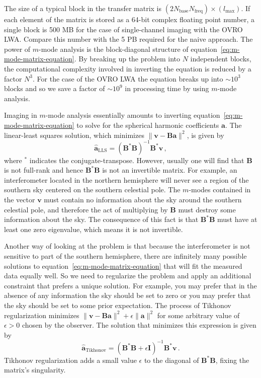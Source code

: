 \documentclass[twocolumn]{aastex6}
\renewcommand{\b}{\pmb}
\begin{document}
The size of a typical block in the transfer matrix is
$(2N_\text{base}N_\text{freq})\times(l_\text{max})$. If each element of the matrix is stored as a
64-bit complex floating point number, a single block is 500 MB for the case of single-channel
imaging with the OVRO LWA. Compare this number with the 5 PB required for the naive approach.  The
power of $m$-mode analysis is the block-diagonal structure of
equation~\ref{eq:m-mode-matrix-equation}.  By breaking up the problem into $N$ independent blocks,
the computational complexity involved in inverting the equation is reduced by a factor $N^3$. For
the case of the OVRO LWA the equation breaks up into $\sim10^3$ blocks and so we save a factor of
$\sim10^9$ in processing time by using $m$-mode analysis.

Imaging in $m$-mode analysis essentially amounts to inverting
equation~\ref{eq:m-mode-matrix-equation} to solve for the spherical harmonic coefficients $\b a$.
The linear-least squares solution, which minimizes $\|\b v - \b B\b a\|^2$, is given by
\begin{equation}
    \b{\hat a}_\text{LLS} = (\b B^*\b B)^{-1}\b B^*\b v\,,
\end{equation}
where $^*$ indicates the conjugate-transpose. However, usually one will find that $\b B$ is not
full-rank and hence $\b B^*\b B$ is not an invertible matrix. For example, an interferometer located
in the northern hemisphere will never see a region of the southern sky centered on the southern
celestial pole. The $m$-modes contained in the vector $\b v$ must contain no information
about the sky around the southern celestial pole, and therefore the act of multiplying by $\b B$
must destroy some information about the sky. The consequence of this fact is that $\b B^*\b B$ must
have at least one zero eigenvalue, which means it is not invertible.

Another way of looking at the problem is that because the interferometer is not sensitive to part of
the southern hemisphere, there are infinitely many possible solutions to
equation~\ref{eq:m-mode-matrix-equation} that will fit the measured data equally well. So we need to
regularize the problem and apply an additional constraint that prefers a unique solution. For
example, you may prefer that in the absence of any information the sky should be set to zero or you
may prefer that the sky should be set to some prior expectation. The process of Tikhonov
regularization minimizes $\|\b v - \b B\b a\|^2 + \epsilon\|\b a\|^2$ for some arbitrary value of
$\epsilon > 0$ chosen by the observer. The solution that minimizes this expression is given by
\begin{equation}
    \b{\hat a}_\text{Tikhonov} = (\b B^*\b B + \epsilon\b I)^{-1}\b B^*\b v\,.
\end{equation}
Tikhonov regularization adds a small value $\epsilon$ to the diagonal of $\b B^*\b B$, fixing the
matrix's singularity.
\end{document}
